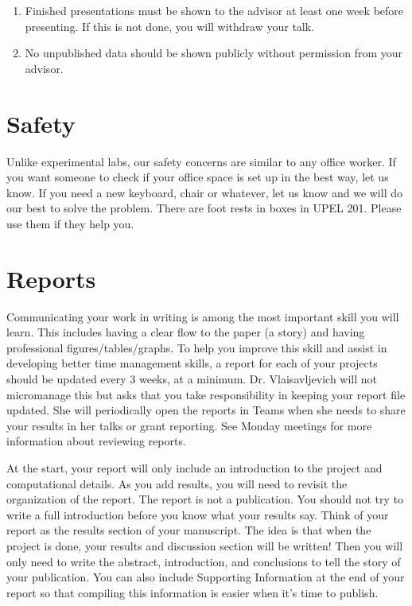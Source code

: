 \documentclass[letterpaper]{article}
\begin{document}
\begin{enumerate}
\item Finished presentations must be shown to the advisor at least one week before presenting. If this is not done, you will withdraw your talk.
\item No unpublished data should be shown publicly without permission from your advisor.
\end{enumerate}


\section*{Safety}
Unlike experimental labs, our safety concerns are similar to any office worker. If you want someone to check if your office space is set up in the best way, let us know. If you need a new keyboard, chair or whatever, let us know and we will do our best to solve the problem. There are foot rests in boxes in UPEL 201. Please use them if they help you.

\section*{Reports}
Communicating your work in writing is among the most important skill you will learn. This includes having a clear flow to the paper (a story) and having professional figures/tables/graphs. To help you improve this skill and assist in developing better time management skills, a report for each of your projects should be updated every 3 weeks, at a minimum. Dr. Vlaisavljevich will not micromanage this but asks that you take responsibility in keeping your report file updated. She will periodically open the reports in Teams when she needs to share your results in her talks or grant reporting. See Monday meetings for more information about reviewing reports.

At the start, your report will only include an introduction to the project and computational details. As you add results, you will need to revisit the organization of the report.  The report is not a publication. You should not try to write a full introduction before you know what your results say. Think of your report as the results section of your manuscript. The idea is that when the project is done, your results and discussion section will be written! Then you will only need to write the abstract, introduction, and conclusions to tell the story of your publication. You can also include Supporting Information at the end of your report so that compiling this information is easier when it's time to publish.
\end{document}
